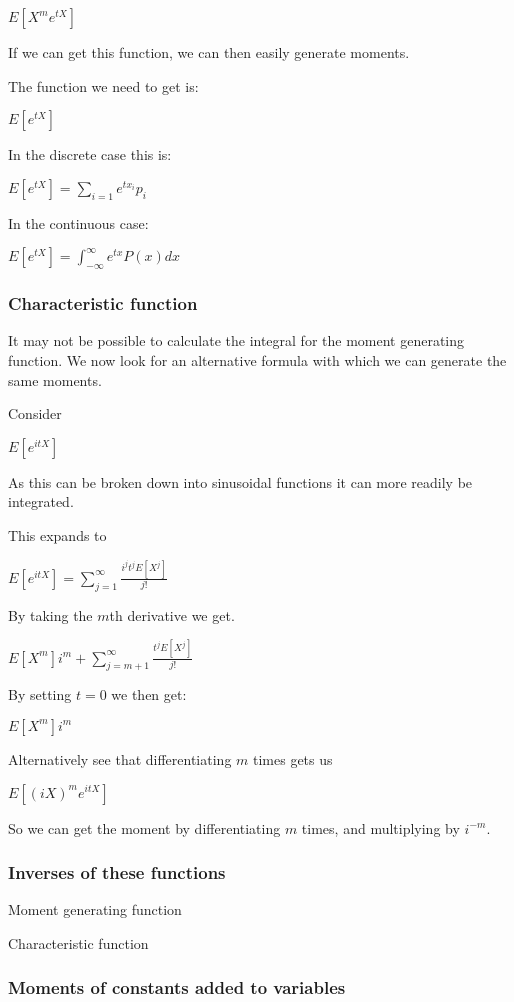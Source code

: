 \(E[X^me^{tX}]\)

If we can get this function, we can then easily generate moments.

The function we need to get is:

\(E[e^{tX}]\)

In the discrete case this is:

\(E[e^{tX}]=\sum_{i=1}e^{tx_i}p_i\)

In the continuous case:

\(E[e^{tX}]=\int_{-\infty }^\infty e^{tx}P(x) dx\)

\subsubsection{Characteristic function}

It may not be possible to calculate the integral for the moment generating function. We now look for an alternative formula with which we can generate the same moments.

Consider

\(E[e^{itX}]\)

As this can be broken down into sinusoidal functions it can more readily be integrated.

This expands to

\(E[e^{itX}]=\sum_{j=1}^\infty \frac{i^jt^jE[X^j]}{j!}\)

By taking the \(m\)th derivative we get.

\(E[X^m]i^m+\sum_{j=m+1}^\infty \frac{t^jE[X^j]}{j!}\)

By setting \(t=0\) we then get:

\(E[X^m]i^m\)

Alternatively see that differentiating \(m\) times gets us

\(E[(iX)^me^{itX}]\)

So we can get the moment by differentiating \(m\) times, and multiplying by \(i^{-m}\).

\subsubsection{Inverses of these functions}

Moment generating function

Characteristic function

\subsubsection{Moments of constants added to variables}

